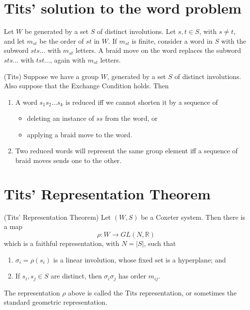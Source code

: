 \documentclass[12pt]{article}
\begin{document}
\section{Tits' solution to the word problem}

\begin{definition}
    Let $W$ be generated by a set $S$ of distinct involutions. Let $s,t\in S$, with $s\neq t$, and let $m_{st}$ be the order of $st$ in $W$. If $m_{st}$ is finite, consider a word in $S$ with the subword $sts...$ with $m_{st}$ letters. A braid move on the word replaces the subword $sts...$ with $tst...$, again with $m_{st}$ letters. 
\end{definition}

\begin{theorem}
    (Tits) Suppose we have a group $W$, generated by a set $S$ of distinct involutions. Also suppose that the Exchange Condition holds. Then
    \begin{enumerate}
        \item A word $s_1s_2...s_k$ is reduced iff we cannot shorten it by a sequence of 
        \begin{itemize}
            \item deleting an instance of $ss$ from the word, or
            \item applying a braid move to the word.
        \end{itemize}
        \item Two reduced words will represent the same group element iff a sequence of braid moves sends one to the other.
    \end{enumerate}
\end{theorem}


\section{Tits' Representation Theorem}
\begin{theorem}
    (Tits' Representation Theorem) Let $(W,S)$ be a Coxeter system. Then there is a map
    \[\rho : W \longrightarrow GL(N,\mathbb{R})\]
    which is a faithful representation, with $N=|S|$, such that
    \begin{enumerate}
        \item $\sigma_i = \rho (s_i)$ is a linear involution, whose fixed set is a hyperplane; and 
        \item If $s_i,s_j\in S$ are distinct, then $\sigma_i\sigma_j$ has order $m_{ij}$.  
    \end{enumerate}
\end{theorem}

\begin{definition}
    The representation $\rho$ above is called the Tits representation, or sometimes the standard geometric representation. 
\end{definition}
\end{document}

